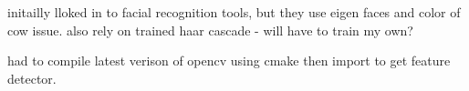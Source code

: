 
initailly lloked in to facial recognition tools, 
but they use eigen faces and color of cow issue.
also rely on trained haar cascade - will have to train my own?



had to compile latest verison of opencv using cmake then import to get feature detector.

